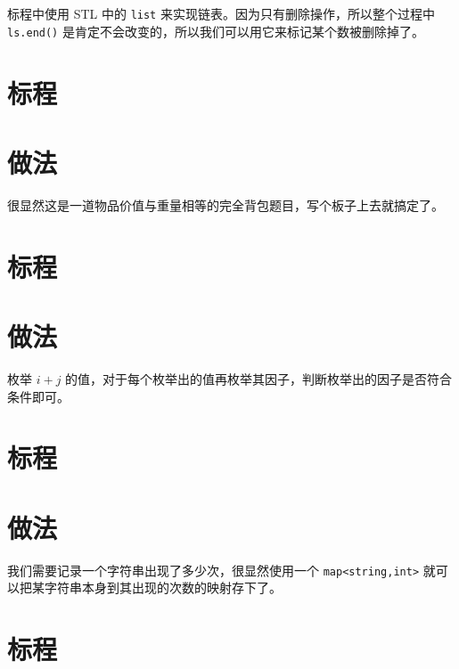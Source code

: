 \documentclass{ctsol}
\begin{document}
标程中使用 STL 中的 \verb|list| 来实现链表。因为只有删除操作，所以整个过程中 \verb|ls.end()| 是肯定不会改变的，所以我们可以用它来标记某个数被删除掉了。

\section*{标程}

\makesolution
\section*{做法}

很显然这是一道物品价值与重量相等的完全背包题目，写个板子上去就搞定了。

\section*{标程}

\makesolution
\section*{做法}

枚举 $i+j$ 的值，对于每个枚举出的值再枚举其因子，判断枚举出的因子是否符合条件即可。

\section*{标程}

\makesolution
\section*{做法}

我们需要记录一个字符串出现了多少次，很显然使用一个 \verb|map<string,int>| 就可以把某字符串本身到其出现的次数的映射存下了。

\section*{标程}
\end{document}
